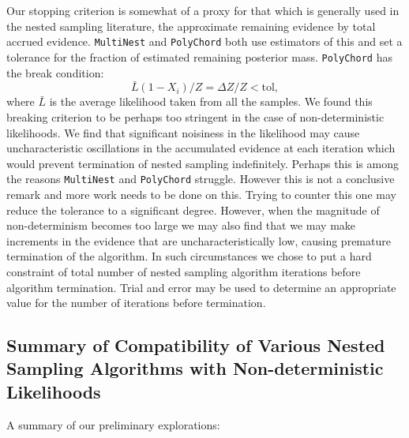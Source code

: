  Our stopping criterion is somewhat of a proxy for that which is generally used in the nested sampling literature, the approximate remaining evidence by total accrued evidence. \texttt{MultiNest} and \texttt{PolyChord} both use estimators of this and set a tolerance for the fraction of estimated remaining posterior mass. \texttt{PolyChord} has the break condition:
%
 \begin{equation}
\bar{L}(1-X_i)/Z=\Delta Z/Z<\mathrm{tol},
 \end{equation}
%
 where $\bar{L}$ is the average likelihood taken from all the samples. We found this breaking criterion to be perhaps too stringent in the case of non-deterministic likelihoods. We find that significant noisiness in the likelihood may cause uncharacteristic oscillations in the accumulated evidence at each iteration which would prevent termination of nested sampling indefinitely. Perhaps this is among the reasons \texttt{MultiNest} and \texttt{PolyChord} struggle. However this is not a conclusive remark and more work needs to be done on this. Trying to counter this one may reduce the tolerance to a significant degree. However, when the magnitude of non-determinism becomes too large we may also find that we may make increments in the evidence that are uncharacteristically low, causing premature termination of the algorithm. In such circumstances we chose to put a hard constraint of total number of nested sampling algorithm iterations before algorithm termination. Trial and error may be used to determine an appropriate value for the number of iterations before termination.

 \subsection{Summary of Compatibility of Various Nested Sampling Algorithms with Non-deterministic Likelihoods}

 A summary of our preliminary explorations:



